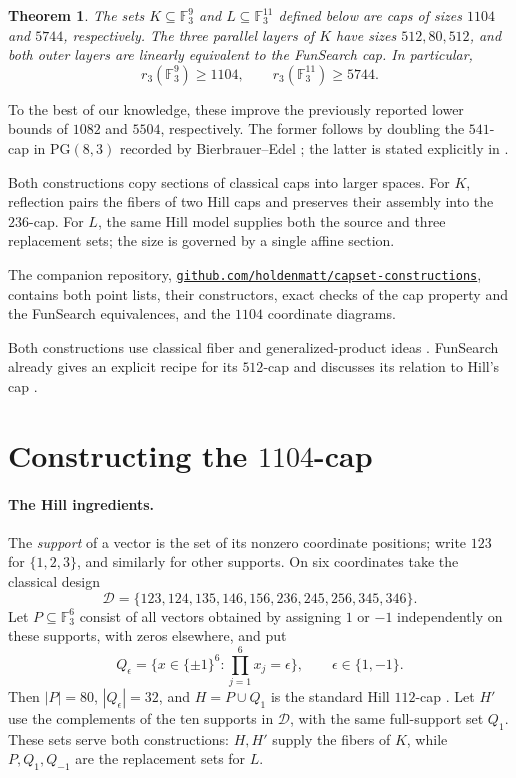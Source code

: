 \documentclass[11pt]{article}
\newcommand{\F}{\mathbb F_3}
\newtheorem{theorem}{Theorem}
\begin{document}
\begin{theorem}\label{thm:main}
The sets $K\subseteq\F^9$ and $L\subseteq\F^{11}$ defined below are caps
of sizes $1104$ and $5744$, respectively. The three parallel layers of
$K$ have sizes $512,80,512$, and both outer layers are linearly equivalent
to the FunSearch cap. In particular,
\[
 r_3(\F^9)\ge1104,\qquad r_3(\F^{11})\ge5744.
\]
\end{theorem}

To the best of our knowledge, these improve the previously reported
lower bounds of $1082$ and $5504$, respectively. The former follows by
doubling the $541$-cap in $\mathrm{PG}(8,3)$ recorded by Bierbrauer--Edel
\cite[Theorem 1 and Table 1]{capsurvey}; the latter is stated explicitly
in \cite[Corollary 2]{karapetyan}.

Both constructions copy sections of classical caps
into larger spaces. For $K$, reflection pairs the fibers of two Hill
caps and preserves their assembly into the $236$-cap. For $L$, the same
Hill model supplies both the source and three replacement sets; the
size is governed by a single affine section.

The companion repository,
\href{https://github.com/holdenmatt/capset-constructions}{\nolinkurl{github.com/holdenmatt/capset-constructions}},
contains both point lists, their constructors, exact checks of the cap
property and the FunSearch equivalences, and the $1104$ coordinate diagrams.

Both constructions use classical fiber and generalized-product ideas
\cite{recursive,extended}. FunSearch already gives an explicit recipe
for its $512$-cap and discusses its relation to Hill's cap
\cite[Figure 4 and Supplement E.2]{funsearch}.

\section{Constructing the $1104$-cap}\label{sec:cap}

\paragraph{The Hill ingredients.}
The \emph{support} of a vector is the set of its nonzero coordinate positions;
write $123$ for $\{1,2,3\}$, and similarly for other supports.
On six coordinates take the classical design
\[
\mathcal D=\{123,124,135,146,156,236,245,256,345,346\}.
\]
Let $P\subseteq\F^6$ consist of all vectors obtained by assigning $1$ or
$-1$ independently on these supports, with zeros elsewhere, and put
\[
 Q_\epsilon=\{x\in\{\pm1\}^6:\textstyle\prod_{j=1}^6x_j=\epsilon\},
 \qquad \epsilon\in\{1,-1\}.
\]
Then $|P|=80$, $|Q_\epsilon|=32$, and $H=P\cup Q_1$ is the standard Hill
$112$-cap \cite[Section 2]{smallcaps}. Let $H'$ use the complements of
the ten supports in $\mathcal D$, with the same full-support set $Q_1$.
These sets serve both constructions: $H,H'$ supply the fibers of $K$,
while $P,Q_1,Q_{-1}$ are the replacement sets for $L$.
\end{document}
